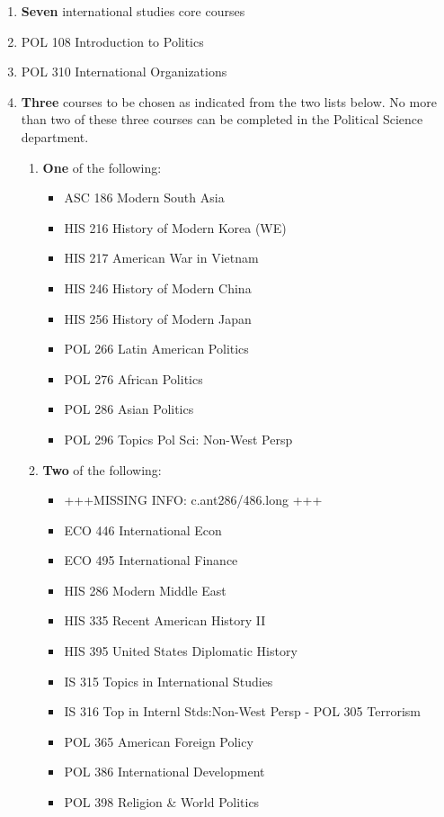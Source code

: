 \documentclass[
  letterpaper,
]{scrbook}
\providecommand{\tightlist}{%
  \setlength{\itemsep}{0pt}\setlength{\parskip}{0pt}}
\begin{document}
\begin{enumerate}
\def\labelenumi{\arabic{enumi}.}
\item
  \textbf{Seven} international studies core courses
\item
  POL 108 Introduction to Politics
\item
  POL 310 International Organizations
\item
  \textbf{Three} courses to be chosen as indicated from the two lists
  below. No more than two of these three courses can be completed in the
  Political Science department.

  \begin{enumerate}
  \def\labelenumii{\alph{enumii}.}
  \tightlist
  \item
    \textbf{One} of the following:

    \begin{itemize}
    \tightlist
    \item
      ASC 186 Modern South Asia
    \item
      HIS 216 History of Modern Korea (WE)
    \item
      HIS 217 American War in Vietnam
    \item
      HIS 246 History of Modern China
    \item
      HIS 256 History of Modern Japan
    \item
      POL 266 Latin American Politics
    \item
      POL 276 African Politics
    \item
      POL 286 Asian Politics
    \item
      POL 296 Topics Pol Sci: Non-West Persp
    \end{itemize}
  \item
    \textbf{Two} of the following:

    \begin{itemize}
    \tightlist
    \item
      +++MISSING INFO: c.ant286/486.long +++
    \item
      ECO 446 International Econ
    \item
      ECO 495 International Finance
    \item
      HIS 286 Modern Middle East
    \item
      HIS 335 Recent American History II
    \item
      HIS 395 United States Diplomatic History
    \item
      IS 315 Topics in International Studies
    \item
      IS 316 Top in Internl Stds:Non-West Persp - POL 305 Terrorism
    \item
      POL 365 American Foreign Policy
    \item
      POL 386 International Development
    \item
      POL 398 Religion \& World Politics
    \end{itemize}
  \end{enumerate}
\end{enumerate}
\end{document}
